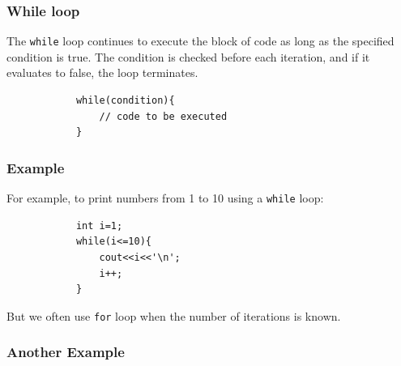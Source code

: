 \documentclass[xcolor=dvipsnames]{beamer}
\begin{document}
    \begin{frame}[fragile]
        \frametitle{While loop}
        The \texttt{while} loop continues to execute the block of code as long as the specified condition is true. The condition is checked before each iteration, and if it evaluates to false, the loop terminates.
        \begin{verbatim}
            while(condition){
                // code to be executed
            }
        \end{verbatim}
    \end{frame}
    \begin{frame}[fragile]
        \frametitle{Example}
        For example, to print numbers from 1 to 10 using a \texttt{while} loop:
        \begin{verbatim}
            int i=1;
            while(i<=10){
                cout<<i<<'\n';
                i++;
            }
        \end{verbatim}
        But we often use \texttt{for} loop when the number of iterations is known.
    \end{frame}
    \begin{frame}[fragile]
        \frametitle{Another Example}
    
    \end{frame}
\end{document}
